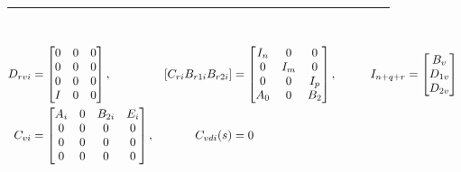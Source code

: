 \documentclass[twocolumn]{autart}    %
\begin{document}
\begin{figure}[hb] %
    \flushleft
    {\noindent}	 \rule[-10pt]{17.5cm}{0.05em}\\
    \vspace{1.5em}
    \begin{equation}
        \begin{aligned}
            D_{rvi} &= 
            \begin{bmatrix}
                0 & 0 & 0 \\
                0 & 0 & 0 \\
                0 & 0 & 0 \\
                I & 0 & 0
            \end{bmatrix}       ,    & [C_{ri} \space B_{r1i} \space B_{r2i}] &= 
                                        \begin{bmatrix}
                                            I_{n} & 0 & 0 \\
                                            0 & I_{m} & 0 \\
                                            0 & 0 & I_{p} \\
                                            A_{0} & 0 & B_{2}
                                            \end{bmatrix}  ,                           \qquad & I_{n+q+r}&= 
                                                                                        \begin{bmatrix}
                                                                                            B_{v} \\
                                                                                            D_{1v} \\
                                                                                            D_{2v} 
                                                                                        \end{bmatrix}\ \\
            C_{vi} &= 
            \begin{bmatrix}
                A_{i} & 0 & B_{2i} & E_{i} \\
                0 & 0 & 0 & 0\\
                0 & 0 & 0 & 0\\
                0 & 0 & 0 & 0
            \end{bmatrix}  ,              & C_{vdi}(s) &= 0 
        \end{aligned}
    \end{equation}
\end{figure}
\end{document}
